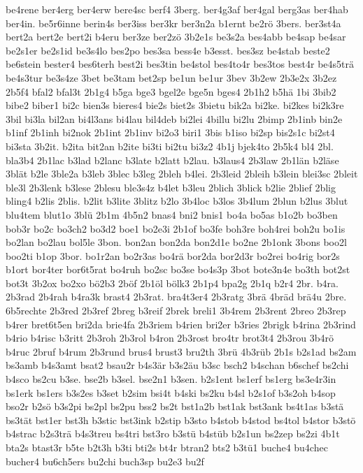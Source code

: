 {be4rene
ber4erg
ber4erw
bere4sc
berf4
3berg.
ber4g3af
ber4gal
berg3as
ber4hab
ber4in.
be5r6inne
berin4s
ber3iss
ber3kr
ber3n2a
b1ernt
be2rö
3bers.
ber3st4a
bert2a
bert2e
bert2i
b4eru
ber3ze
ber2zö
3b2e1s
be3s2a
bes4abb
be4sap
be4sar
be2s1er
be2s1id
be3s4lo
bes2po
bes3sa
bess4e
b3esst.
bes3sz
be4stab
beste2
be6stein
bester4
bes6terh
best2i
bes3tin
be4stol
bes4to4r
bes3tos
best4r
be4s5trä
be4s3tur
be3s4ze
3bet
be3tam
bet2sp
be1un
be1ur
3bev
3b2ew
2b3e2x
3b2ez
2b5f4
bfal2
bfal3t
2b1g4
b5ga
bge3
bgel2e
bge5n
bges4
2b1h2
b5hä
1bi
3bib2
bibe2
biber1
bi2c
bien3s
bieres4
bie2s
biet2s
3bietu
bik2a
bi2ke.
bi2kes
bi2k3re
3bil
bi3la
bil2an
bi4l3ans
bi4lau
bil4deb
bi2lei
4billu
bi2lu
2bimp
2b1inb
bin2e
b1inf
2b1inh
bi2nok
2b1int
2b1inv
bi2o3
biri1
3bis
b1iso
bi2sp
bis2s1c
bi2st4
bi3sta
3b2it.
b2ita
bit2an
b2ite
bi3ti
bi2tu
bi3z2
4b1j
bjek4to
2b5k4
bl4
2bl.
bla3b4
2b1lac
b3lad
b2lanc
b3late
b2latt
b2lau.
b3laus4
2b3law
2b1län
b2läse
3blät
b2le
3ble2a
b3leb
3blec
b3leg
2bleh
b4lei.
2b3leid
2bleih
b3lein
blei3sc
2bleit
ble3l
2b3lenk
b3lese
2blesu
ble3s4z
b4let
b3leu
2blich
3blick
b2lie
2blief
2blig
bling4
b2lis
2blis.
b2lit
b3lite
3blitz
b2lo
3b4loc
b3los
3b4lum
2blun
b2lus
3blut
blu4tem
blut1o
3blü
2b1m
4b5n2
bnas4
bni2
bnis1
bo4a
bo5as
b1o2b
bo3ben
bob3r
bo2c
bo3ch2
bo3d2
boe1
bo2e3i
2b1of
bo3fe
boh3re
boh4rei
boh2u
bo1is
bo2lan
bo2lau
bol5le
3bon.
bon2an
bon2da
bon2d1e
bo2ne
2b1onk
3bons
boo2l
boo2ti
b1op
3bor.
bo1r2an
bo2r3as
bo4rä
bor2da
bor2d3r
bo2rei
bo4rig
bor2s
b1ort
bor4ter
bor6t5rat
bo4ruh
bo2sc
bo3se
bo4s3p
3bot
bote3n4e
bo3th
bot2st
bot3t
3b2ox
bo2xo
bö2b3
2böf
2b1öl
bölk3
2b1p4
bpa2g
2b1q
b2r4
2br.
b4ra.
2b3rad
2b4rah
b4ra3k
brast4
2b3rat.
bra4t3er4
2b3ratg
3brä
4bräd
brä4u
2bre.
6b5rechte
2b3red
2b3ref
2breg
b3reif
2brek
breli1
3b4rem
2b3rent
2breo
2b3rep
b4rer
bret6t5en
bri2da
brie4fa
2b3riem
b4rien
bri2er
b3ries
2brigk
b4rina
2b3rind
b4rio
b4risc
b3ritt
2b3roh
2b3rol
b4ron
2b3rost
bro4tr
brot3t4
2b3rou
3b4rö
b4ruc
2bruf
b4rum
2b3rund
brus4
brust3
bru2th
3brü
4b3rüb
2b1s
b2s1ad
bs2am
bs3amb
b4s3amt
bsat2
bsau2r
b4s3är
b3s2äu
b3sc
bsch2
b4schan
b6schef
bs2chi
b4sco
bs2cu
b3se.
bse2b
b3sel.
bse2n1
b3sen.
b2s1ent
bs1erf
bs1erg
bs3e4r3in
bs1erk
bs1ers
b3s2es
b3set
b2sim
bsi4t
b4ski
bs2ku
b4sl
b2s1of
b3s2oh
b4sop
bso2r
b2sö
b3s2pi
bs2pl
bs2pu
bss2
bs2t
bst1a2b
bst1ak
bst3ank
bs4t1as
b3stä
bs3tät
bst1er
bst3h
b3stic
bst3ink
b2stip
b3sto
b4stob
b4stod
bs4tol
b4stor
b3stö
b4strac
b2s3trä
b4s3treu
bs4tri
bst3ro
b3stü
b4stüb
b2s1un
bs2zep
bs2zi
4b1t
bta2s
btast3r
b5te
b2t3h
b3ti
bti2s
bt4r
btran2
bts2
b3tü1
buche4
bu4chec
bucher4
bu6ch5ers
bu2chi
buch3sp
bu2e3
bu2f
}
